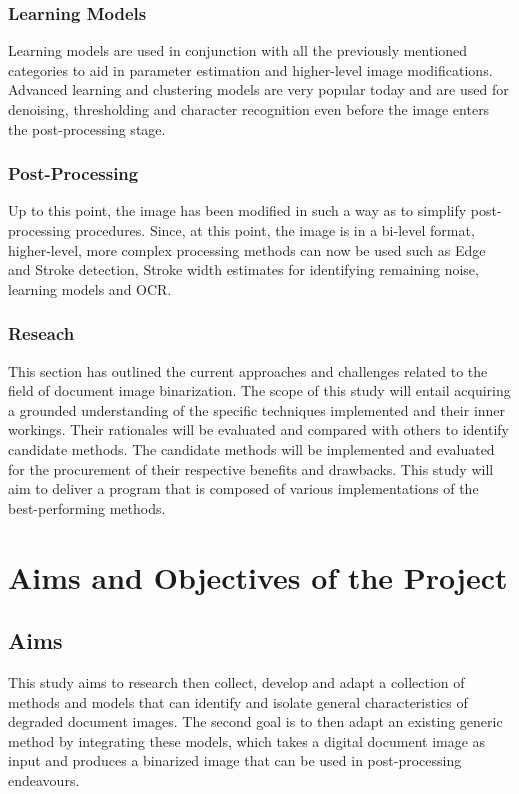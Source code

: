 \documentclass[a4paper, 12pt]{report}
\begin{document}
\subsubsection{Learning Models}
Learning models are used in conjunction with all the previously mentioned categories to aid in parameter estimation and higher-level image modifications. Advanced learning and clustering models are very popular today and are used for denoising, thresholding and character recognition even before the image enters the post-processing stage.

\subsubsection{Post-Processing}
Up to this point, the image has been modified in such a way as to simplify post-processing procedures. Since, at this point, the image is in a bi-level format, higher-level, more complex processing methods can now be used such as Edge and Stroke detection, Stroke width estimates for identifying remaining noise, learning models and OCR.

\subsubsection{Reseach}
This section has outlined the current approaches and challenges related to the field of document image binarization. The scope of this study will entail acquiring a grounded understanding of the specific techniques implemented and their inner workings. Their rationales will be evaluated and compared with others to identify candidate methods. The candidate methods will be implemented and evaluated for the procurement of their respective benefits and drawbacks. This study will aim to deliver a program that is composed of various implementations of the best-performing methods.
\newpage

\section{Aims and Objectives of the Project}
\subsection{Aims}
This study aims to research then collect, develop and adapt a collection of methods and models that can identify and isolate general characteristics of degraded document images. The second goal is to then adapt an existing generic method by integrating these models, which takes a digital document image as input and produces a binarized image that can be used in post-processing endeavours.
\end{document}
